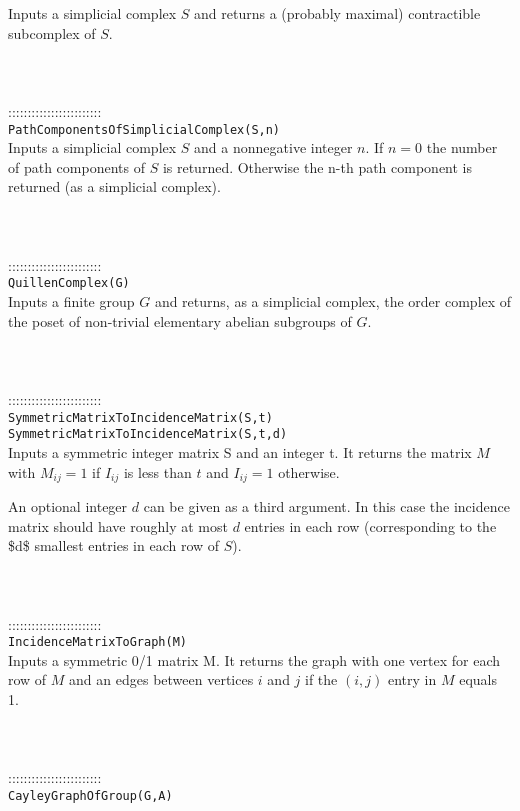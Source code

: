 \documentclass[a4paper,11pt]{report}
\begin{document}
{ Inputs a simplicial complex $S$ and returns a (probably maximal) contractible subcomplex of $S$. \\
 \\
 \\
 \\
 ::::::::::::::::::::::::\\
 \texttt{PathComponentsOfSimplicialComplex(S,n)}\\
 

 Inputs a simplicial complex $S$ and a nonnegative integer $n$. If $n=0$ the number of path components of $S$ is returned. Otherwise the n-th path component is returned (as a simplicial
complex). \\
 \\
 \\
 \\
 ::::::::::::::::::::::::\\
 \texttt{QuillenComplex(G)}\\
 

 Inputs a finite group $G$ and returns, as a simplicial complex, the order complex of the poset of
non-trivial elementary abelian subgroups of $G$. \\
 \\
 \\
 \\
 ::::::::::::::::::::::::\\
 \texttt{SymmetricMatrixToIncidenceMatrix(S,t)}\\
 \texttt{SymmetricMatrixToIncidenceMatrix(S,t,d)}\\
 

 Inputs a symmetric integer matrix S and an integer t. It returns the matrix $M$ with $M_{ij}=1$ if $I_{ij}$ is less than $ t$ and $I_{ij}=1$ otherwise. 

 An optional integer $d$ can be given as a third argument. In this case the incidence matrix should
have roughly at most $d$ entries in each row (corresponding to the \$d\$ smallest entries in each row
of $S$). \\
 \\
 \\
 \\
 ::::::::::::::::::::::::\\
 \texttt{IncidenceMatrixToGraph(M)}\\
 

 Inputs a symmetric 0/1 matrix M. It returns the graph with one vertex for each
row of $M$ and an edges between vertices $i$ and $j$ if the $(i,j)$ entry in $M$ equals 1. \\
 \\
 \\
 \\
 ::::::::::::::::::::::::\\
 \texttt{CayleyGraphOfGroup(G,A)}\\
 

}
\end{document}
